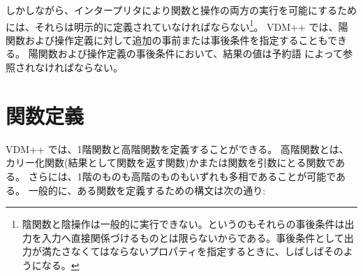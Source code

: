 \documentclass[\pformat,12pt]{jarticle}
\newcommand{\vdmslpp}[2]{%
#2
}
\newcommand{\vdmpp}{VDM++}
\begin{document}
しかしながら、インタープリタにより関数と操作の両方の実行を可能にするためには、それらは明示的に定義されていなければならない\footnote{陰関数と陰操作は一般的に実行できない。というのもそれらの事後条件は出力を入力へ直接関係づけるものとは限らないからである。事後条件として出力が満たさなくてはならないプロパティを指定するときに、しばしばそのようになる。}。
\vdmslpp{VDM-SL}{\vdmpp}では、陽関数および操作定義に対して追加の事前または事後条件を指定することもできる。
陽関数および操作定義の事後条件において、結果の値は予約語 によって参照されなければならない。
 
\section{関数定義}\label{functiondef}

\vdmslpp{VDM-SL}{\vdmpp}では、1階関数と高階関数を定義することができる。 
高階関数とは、カリー化関数(結果として関数を返す関数)かまたは関数を引数にとる関数である。
さらには、1階のものも高階のものもいずれも多相であることが可能である。
一般的に、ある関数を定義するための構文は次の通り:







\end{document}
